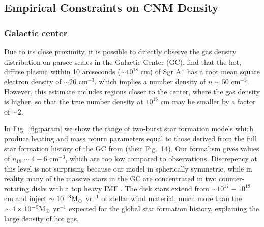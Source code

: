 \documentclass[usenatbib,fleqn]{mnras}
\newcommand{\Msun}{{\rm M_\odot}}
\begin{document}

\subsection{Empirical Constraints on CNM Density}
\label{sec:empirical}

\subsubsection{Galactic center} 
Due to its close proximity, it is possible to directly observe the gas
density distribution on parsec scales in the Galactic Center
(GC). \citet{Baganoff+2003} find that the hot, diffuse plasma within
10 arcseconds ($\sim 10^{18}$ cm) of Sgr A* has a root mean square
electron density of $\sim 26$ cm$^{-3}$, which implies a number
density of $n\sim 50$ cm$^{-3}$. However, this estimate includes
regions closer to the center, where the gas density is higher, so that
the true number density at $10^{18}$ cm may be smaller by a factor of
$\sim 2$.

In Fig.~\ref{fig:param} we show the range of two-burst star formation
models which produce heating and mass return parameters equal to those
derived from the full star formation history of the GC from
\citet{Pfuhl+2011} (their Fig.~14).  Our formalism gives values of
$n_{18}\sim 4-6$ cm$^{-3}$, which are too low compared to
observations.  Discrepency at this level is not surprising because our
model in spherically symmetric, while in reality many of the massive
stars in the GC are concentrated in two counter-rotating disks
\citep{Genzel+2003} with a top heavy IMF \citep{Bartko+2011}.  The
disk stars extend from $\sim 10^{17}-10^{18}$ cm and inject $\sim
10^{-3} \Msun$ yr$^{-1}$ of stellar wind material, much more than the
$\sim 4 \times 10^{-5} \Msun$ yr$^{-1}$ expected for the global star
formation history, explaining the large density of hot gas.
\end{document}
